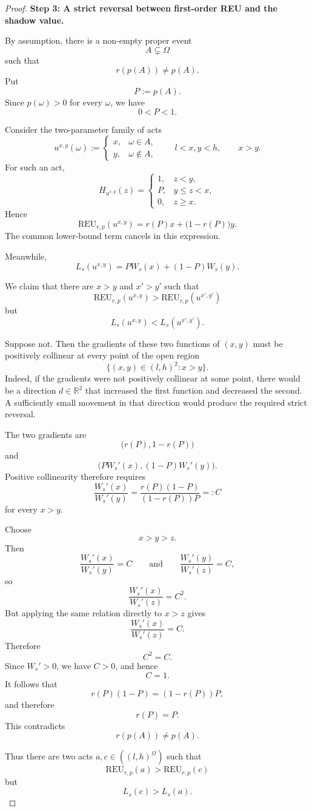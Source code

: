 \documentclass[a4paper,final]{article}
\newcommand\REU{\mathrm{REU}}
\renewcommand{\leq}{\leqslant}
\renewcommand{\geq}{\geqslant}
\newenvironment{CCM rewritten}
{\begingroup\color{blue}} %
{\endgroup}              %
\begin{document}
\begin{proof}
\medskip
\noindent
\textbf{Step 3: A strict reversal between first-order REU and the
shadow value.}

By assumption, there is a non-empty proper event
\[
A\subsetneq\Omega
\]
such that
\[
r(p(A))\neq p(A).
\]
Put
\[
P:=p(A).
\]
Since \(p(\omega)>0\) for every \(\omega\), we have
\[
0<P<1.
\]

Consider the two-parameter family of acts
\[
u^{x,y}(\omega)
:=
\begin{cases}
x, & \omega\in A,\\
y, & \omega\notin A,
\end{cases}
\qquad
l<x,y<h,
\qquad
x>y.
\]
For such an act,
\[
H_{u^{x,y}}(z)
=
\begin{cases}
1, & z<y,\\
P, & y\leq z<x,\\
0, & z\geq x.
\end{cases}
\]
Hence
\[
\REU_{r,p}(u^{x,y})
=
r(P)x+\bigl(1-r(P)\bigr)y.
\]
The common lower-bound term cancels in this expression.

Meanwhile,
\[
L_s(u^{x,y})
=
P W_s(x)+(1-P)W_s(y).
\]

We claim that there are \(x>y\) and \(x'>y'\) such that
\[
\REU_{r,p}(u^{x,y})
>
\REU_{r,p}(u^{x',y'})
\]
but
\[
L_s(u^{x,y})
<
L_s(u^{x',y'}).
\]

Suppose not. Then the gradients of these two functions of \((x,y)\)
must be positively collinear at every point of the open region
\[
\{(x,y)\in(l,h)^2:x>y\}.
\]
Indeed, if the gradients were not positively collinear at some point,
there would be a direction \(d\in\mathbb R^2\) that increased the first
function and decreased the second. A sufficiently small movement in
that direction would produce the required strict reversal.

The two gradients are
\[
\bigl(r(P),1-r(P)\bigr)
\]
and
\[
\bigl(PW_s'(x),(1-P)W_s'(y)\bigr).
\]
Positive collinearity therefore requires
\[
\frac{W_s'(x)}{W_s'(y)}
=
\frac{r(P)(1-P)}
     {(1-r(P))P}
=:C
\]
for every \(x>y\).

Choose
\[
x>y>z.
\]
Then
\[
\frac{W_s'(x)}{W_s'(y)}=C
\qquad\text{and}\qquad
\frac{W_s'(y)}{W_s'(z)}=C,
\]
so
\[
\frac{W_s'(x)}{W_s'(z)}=C^2.
\]
But applying the same relation directly to \(x>z\) gives
\[
\frac{W_s'(x)}{W_s'(z)}=C.
\]
Therefore
\[
C^2=C.
\]
Since \(W_s'>0\), we have \(C>0\), and hence
\[
C=1.
\]
It follows that
\[
r(P)(1-P)
=
(1-r(P))P,
\]
and therefore
\[
r(P)=P.
\]
This contradicts
\[
r(p(A))\neq p(A).
\]

Thus there are two acts \(a,c\in((l,h)^\Omega)\) such that
\[
\REU_{r,p}(a)>\REU_{r,p}(c)
\]
but
\[
L_s(c)>L_s(a).
\]


\end{proof}
\end{document}
